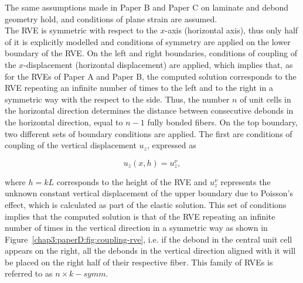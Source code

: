 The same assumptions made in Paper B and Paper C on laminate and debond geometry hold, and conditions of plane strain are assumed.\\
The RVE is symmetric with respect to the $x$-axis (horizontal axis), thus only half of it is explicitly modelled and conditions of symmetry are applied on the lower boundary of the RVE. On the left and right boundaries, conditions of coupling of the $x$-displacement (horizontal displacement) are applied, which implies that, as for the RVEs of Paper A and Paper B, the computed solution corresponds to the RVE repeating an infinite number of times to the left and to the right in a symmetric way with the respect to the side. Thus, the number $n$ of unit cells in the horizontal direction determines the distance between consecutive debonds in the horizontal direction, equal to $n-1$ fully bonded fibers. On the top boundary, two different sets of boundary conditions are applied. The first are conditions of coupling of the vertical displacement $u_{z}$, expressed as

\begin{equation}
u_{z}\left(x,h\right)=u_{z}^{\nu},
\end{equation}

where $h=kL$ corresponds to the height of the RVE and $u_{z}^{\nu}$ represents the unknown constant vertical displacement of the upper boundary due to Poisson's effect, which is calculated as part of the elastic solution. This set of conditions implies that the computed solution is that of the RVE repeating an infinite number of times in the vertical direction in a symmetric way as shown in Figure~\ref{chap3:paperD:fig:coupling-rve}, i.e. if the debond in the central unit cell appears on the right, all the debonds in the vertical direction aligned with it will be placed on the right half of their respective fiber. This family of RVEs is referred to as $n\times k-symm$.

